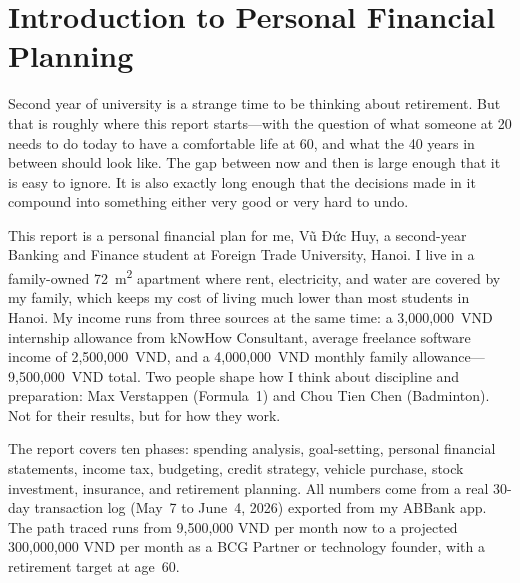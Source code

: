 \chapter*{Introduction to Personal Financial Planning}

Second year of university is a strange time to be thinking about retirement. But that is roughly where this report starts---with the question of what someone at 20 needs to do today to have a comfortable life at 60, and what the 40 years in between should look like. The gap between now and then is large enough that it is easy to ignore. It is also exactly long enough that the decisions made in it compound into something either very good or very hard to undo.

This report is a personal financial plan for me, Vũ Đức Huy, a second-year Banking and Finance student at Foreign Trade University, Hanoi. I live in a family-owned 72~m\textsuperscript{2} apartment where rent, electricity, and water are covered by my family, which keeps my cost of living much lower than most students in Hanoi. My income runs from three sources at the same time: a 3,000,000~VND internship allowance from kNowHow Consultant, average freelance software income of 2,500,000~VND, and a 4,000,000~VND monthly family allowance---9,500,000~VND total. Two people shape how I think about discipline and preparation: Max Verstappen (Formula~1) and Chou Tien Chen (Badminton). Not for their results, but for how they work.

The report covers ten phases: spending analysis, goal-setting, personal financial statements, income tax, budgeting, credit strategy, vehicle purchase, stock investment, insurance, and retirement planning. All numbers come from a real 30-day transaction log (May~7 to June~4, 2026) exported from my ABBank app. The path traced runs from 9,500,000 VND per month now to a projected 300,000,000 VND per month as a BCG Partner or technology founder, with a retirement target at age~60.
